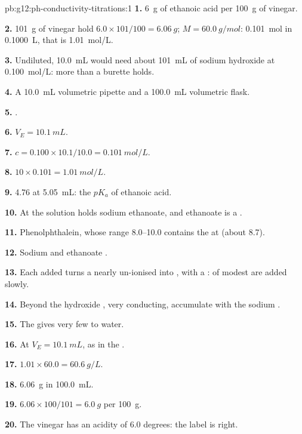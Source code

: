 \begin{solution}{pb:g12:ph-conductivity-titrations:1}
\textbf{1.} \qty{6}{g} of ethanoic acid per \qty{100}{g} of vinegar.

\textbf{2.} \qty{101}{g} of vinegar hold $6.0 \times 101/100 =
\qty{6.06}{g}$; $M = \qty{60.0}{g/mol}$: \qty{0.101}{mol} in
\qty{0.1000}{L}, that is \qty{1.01}{mol/L}.

\textbf{3.} Undiluted, \qty{10.0}{mL} would need about \qty{101}{mL} of
sodium hydroxide at \qty{0.100}{mol/L}: more than a burette holds.

\textbf{4.} A \qty{10.0}{mL} volumetric pipette and a \qty{100.0}{mL}
volumetric flask.

\textbf{5.} .

\textbf{6.} $V_E = \qty{10.1}{mL}$.

\textbf{7.} $c = 0.100 \times 10.1 / 10.0 = \qty{0.101}{mol/L}$.

\textbf{8.} $10 \times 0.101 = \qty{1.01}{mol/L}$.

\textbf{9.}  4.76 at \qty{5.05}{mL}: the $pK_a$ of ethanoic acid.

\textbf{10.} At  the solution holds sodium ethanoate, and
ethanoate is a .

\textbf{11.} Phenolphthalein, whose range 8.0--10.0 contains the  at
 (about 8.7).

\textbf{12.} Sodium  and ethanoate .

\textbf{13.} Each  added turns a nearly un-ionised  into
, with a :  of modest  are added
slowly.

\textbf{14.} Beyond  the hydroxide , very conducting,
accumulate with the sodium .

\textbf{15.} The  gives very few  to water.

\textbf{16.} At $V_E = \qty{10.1}{mL}$, as in the .

\textbf{17.} $1.01 \times 60.0 = \qty{60.6}{g/L}$.

\textbf{18.} \qty{6.06}{g} in \qty{100.0}{mL}.

\textbf{19.} $6.06 \times 100 / 101 = \qty{6.0}{g}$ per \qty{100}{g}.

\textbf{20.} The vinegar has an acidity of 6.0 degrees: the label is
right.
\end{solution}
